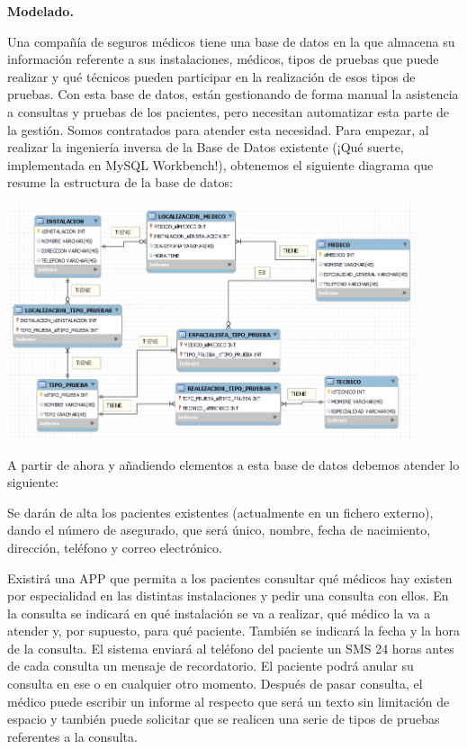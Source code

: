 \documentclass[12pt,a4paper,addpoints,answers]{exam}
\begin{document}
\begin{questions}

\question[2\half] \textbf{Modelado.}

Una compañía de seguros médicos tiene una base de datos en la que almacena su información referente a sus instalaciones, médicos, tipos de pruebas que puede realizar y qué técnicos pueden participar en la realización de esos tipos de pruebas. Con esta base de datos, están gestionando de forma manual la asistencia a consultas y pruebas de los pacientes, pero necesitan automatizar esta parte de la gestión. Somos contratados para atender esta necesidad. Para empezar, al realizar la ingeniería inversa de la Base de Datos existente (¡Qué suerte, implementada en MySQL Workbench!), obtenemos el siguiente diagrama que resume la estructura de la base de datos:

\begin{center}
\includegraphics[width=0.9\textwidth]{figs/bbdd-2023-2024-ordinaria/mer-enunciado.jpg}
\end{center}

A partir de ahora y añadiendo elementos a esta base de datos debemos atender lo siguiente: 

Se darán de alta los pacientes existentes (actualmente en un fichero externo), dando el número de asegurado, que será único, nombre, fecha de nacimiento, dirección, teléfono y correo electrónico. 

Existirá una APP que permita a los pacientes consultar qué médicos hay existen por especialidad en las distintas instalaciones y pedir una consulta con ellos. En la consulta se indicará en qué instalación se va a realizar, qué médico la va a atender y, por supuesto, para qué paciente. También se indicará la fecha y la hora de la consulta. El sistema enviará al teléfono del paciente un SMS 24 horas antes de cada consulta un mensaje de recordatorio. El paciente podrá anular su consulta en ese o en cualquier otro momento. Después de pasar consulta, el médico puede escribir un informe al respecto que será un texto sin limitación de espacio y también puede solicitar que se realicen una serie de tipos de pruebas referentes a la consulta.


\end{questions}
\end{document}
